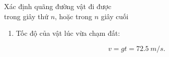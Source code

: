 \begin{dang}{Xác định quãng đường vật đi được \\trong giây thứ $n$, hoặc trong $n$ giây cuối}
{{\begin{enumerate}[label=\alph*.]
			Quãng đường vật rơi trong $t$ giây: 
			$$s = \dfrac{1}{2}gt^2.$$
			
			Quãng đường vật rơi trong ($t - 2$) giây: 
			$$s_1 =\dfrac{1}{2}g(t-2)^2.$$
			
			Quãng đường vật rơi trong 5 giây đầu tiên: 
			$$s_5 = \dfrac{1}{2}gt_5^2.$$
			
			Quãng đường vật rơi trong 2 giây cuối: 
			$$s_2 = s - s_1 = s_5 \quad\Leftrightarrow\quad  \dfrac{1}{2}gt^2 - \dfrac{1}{2}g(t-2)^2 = \dfrac{1}{2}gt_5^2 \quad\Rightarrow\quad t = \SI{7,25}{s}.$$
			
			Độ cao lúc thả vật:
			$$s = \dfrac{1}{2}gt^2= \SI{262,81}{m}.$$
			\item  Tốc độ của vật lúc vừa chạm đất:
			
			$$v = gt = \SI{72,5}{m/s}.$$
		\end{enumerate}
	}}
	
\end{dang}
